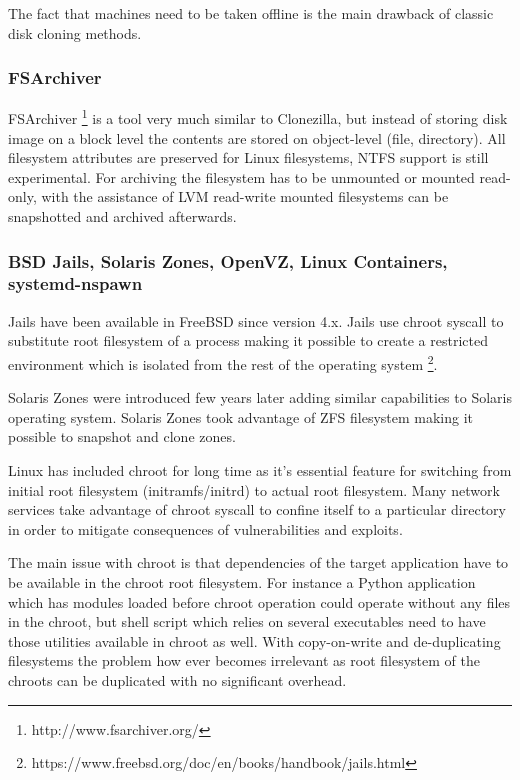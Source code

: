 \documentclass{article}
\begin{document}
The fact that machines need to be taken offline is the main
drawback of classic disk cloning methods. 

\subsubsection{FSArchiver}

FSArchiver
\footnote{http://www.fsarchiver.org/}
is a tool very much similar to Clonezilla,
but instead of storing disk image on a block level the
contents are stored on object-level (file, directory).
All filesystem attributes are preserved for Linux filesystems,
NTFS support is still experimental.
For archiving the filesystem has to be unmounted or mounted
read-only, with the assistance of LVM read-write mounted
filesystems can be snapshotted and archived afterwards.


\subsubsection{BSD Jails, Solaris Zones, OpenVZ, Linux Containers, systemd-nspawn}

Jails have been available in FreeBSD since version 4.x. Jails use chroot
syscall to substitute root filesystem of a process making it possible to
create a restricted environment which is isolated from the rest of the
operating system
\footnote{https://www.freebsd.org/doc/en/books/handbook/jails.html}.

Solaris Zones were introduced few years later adding similar capabilities to Solaris operating system. Solaris Zones took advantage of ZFS filesystem making it possible to snapshot and clone zones.

Linux has included chroot for long time as it's essential feature for switching from initial root filesystem (initramfs/initrd) to actual root filesystem.
Many network services take advantage of chroot syscall to confine
itself to a particular directory in order to mitigate consequences
of vulnerabilities and exploits.

The main issue with chroot is that dependencies of the target
application have to be available in the chroot root filesystem.
For instance a Python application which has modules loaded before
chroot operation could operate without any files in the chroot,
but shell script which relies on several executables need to have
those utilities available in chroot as well.
With copy-on-write and de-duplicating filesystems the problem
how ever becomes irrelevant as root
filesystem of the chroots can be duplicated with no significant overhead.
\end{document}
